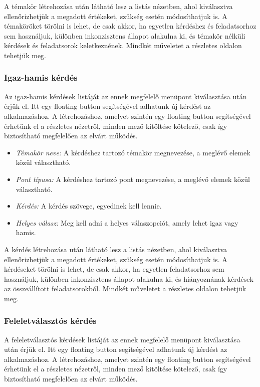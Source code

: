 A témakör létrehozása után látható lesz a listás nézetben, ahol kiválasztva ellenőrizhetjük a megadott értékeket, szükség esetén módosíthatjuk is.
A témaköröket törölni is lehet, de csak akkor, ha egyetlen kérdéshez és feladatsorhoz sem használjuk, különben inkonzisztens állapot alakulna ki, és témakör nélküli kérdések és feladatsorok keletkeznének.
Mindkét műveletet a részletes oldalon tehetjük meg.

\subsubsection{Igaz-hamis kérdés}

Az igaz-hamis kérdések listáját az ennek megfelelő menüpont kiválasztása után érjük el.
Itt egy floating button segítségével adhatunk új kérdést az alkalmazáshoz.
A létrehozáshoz, amelyet szintén egy floating button segítségével érhetünk el a részletes nézetről, minden mező kitöltése kötelező, csak így biztosítható megfelelően az elvárt működés.

\begin{itemize}
    \item \emph{Témakör neve:} A kérdéshez tartozó témakör megnevezése, a meglévő elemek közül választható.
    \item \emph{Pont típusa:} A kérdéshez tartozó pont megnevezése, a meglévő elemek közül választható.
    \item \emph{Kérdés:} A kérdés szövege, egyedinek kell lennie.
    \item \emph{Helyes válasz:} Meg kell adni a helyes válaszopciót, amely lehet igaz vagy hamis.
\end{itemize}

A kérdés létrehozása után látható lesz a listás nézetben, ahol kiválasztva ellenőrizhetjük a megadott értékeket, szükség esetén módosíthatjuk is.
A kérdéseket törölni is lehet, de csak akkor, ha egyetlen feladatsorhoz sem használjuk, különben inkonzisztens állapot alakulna ki, és hiányoznának kérdések az összeállított feladatsorokból.
Mindkét műveletet a részletes oldalon tehetjük meg.

\subsubsection{Feleletválasztós kérdés}

A feleletválasztós kérdések listáját az ennek megfelelő menüpont kiválasztása után érjük el.
Itt egy floating button segítségével adhatunk új kérdést az alkalmazáshoz.
A létrehozáshoz, amelyet szintén egy floating button segítségével érhetünk el a részletes nézetről, minden mező kitöltése kötelező, csak így biztosítható megfelelően az elvárt működés.

